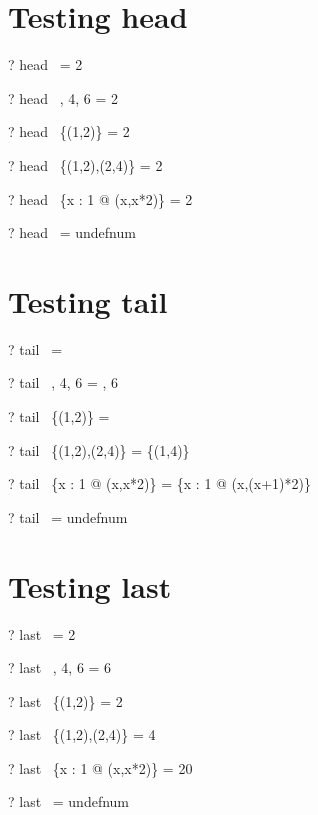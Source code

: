 \documentclass{article}
\begin{document}
\section{Testing head}
\begin{zed} \vdash? head~  \rangle = 2 \end{zed}
\begin{zed} \vdash? head~ , 4, 6 \rangle = 2 \end{zed}
\begin{zed} \vdash? head~ \{(1,2)\} = 2 \end{zed}
\begin{zed} \vdash? head~ \{(1,2),(2,4)\} = 2 \end{zed}
\begin{zed} \vdash? head~ \{x : 1  @ (x,x*2)\} = 2 \end{zed}
\begin{zed} \vdash? head~ \langle \rangle = undefnum \end{zed}

\section{Testing tail}
\begin{zed} \vdash? tail~  \rangle = \emptyset \end{zed}
\begin{zed} \vdash? tail~ , 4, 6 \rangle = , 6 \rangle \end{zed}
\begin{zed} \vdash? tail~ \{(1,2)\} = \emptyset \end{zed}
\begin{zed} \vdash? tail~ \{(1,2),(2,4)\} = \{(1,4)\} \end{zed}
\begin{zed} \vdash? tail~ \{x : 1  @ (x,x*2)\} = \{x : 1  @ (x,(x+1)*2)\} \end{zed}
\begin{zed} \vdash? tail~ \langle \rangle = undefnum \end{zed}

\section{Testing last}
\begin{zed} \vdash? last~  \rangle = 2 \end{zed}
\begin{zed} \vdash? last~ , 4, 6 \rangle = 6 \end{zed}
\begin{zed} \vdash? last~ \{(1,2)\} = 2 \end{zed}
\begin{zed} \vdash? last~ \{(1,2),(2,4)\} = 4 \end{zed}
\begin{zed} \vdash? last~ \{x : 1  @ (x,x*2)\} = 20 \end{zed}
\begin{zed} \vdash? last~ \langle \rangle = undefnum \end{zed}
\end{document}
